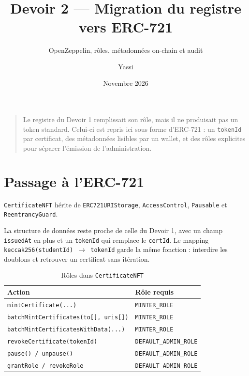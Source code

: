 \documentclass[11pt,a4paper,parskip=half]{scrartcl}
\title{Devoir 2 --- Migration du registre vers ERC-721}
\subtitle{OpenZeppelin, rôles, métadonnées on-chain et audit}
\author{Yassi}
\date{Novembre 2026}
\begin{document}
\maketitle

\begin{quote}
\small
Le registre du Devoir 1 remplissait son rôle, mais il ne produisait pas un token
standard. Celui-ci est repris ici sous forme d'ERC-721 : un \texttt{tokenId} par
certificat, des métadonnées lisibles par un wallet, et des rôles explicites pour
séparer l'émission de l'administration.
\end{quote}

\section{Passage à l'ERC-721}

{\footnotesize
\texttt{CertificateNFT} hérite de \texttt{ERC721URIStorage}, \allowbreak
\texttt{AccessControl}, \allowbreak \texttt{Pausable} et \allowbreak
\texttt{ReentrancyGuard}.}

La structure de données reste proche de celle du Devoir 1, avec un champ
\texttt{issuedAt} en plus et un \texttt{tokenId} qui remplace le \texttt{certId}.
Le mapping \texttt{keccak256(studentId) $\to$ tokenId} garde la même fonction :
interdire les doublons et retrouver un certificat sans itération.

\begin{table}[htbp]
\centering
\caption{Rôles dans \texttt{CertificateNFT}}
\small
\begin{tabularx}{\textwidth}{@{}Xl@{}}
\toprule
Action & Rôle requis \\
\midrule
\texttt{\footnotesize mintCertificate(...)} & \texttt{\footnotesize MINTER\_ROLE} \\
\texttt{\footnotesize batchMintCertificates(to[], uris[])} & \texttt{\footnotesize MINTER\_ROLE} \\
\texttt{\footnotesize batchMintCertificatesWithData(...)} & \texttt{\footnotesize MINTER\_ROLE} \\
\texttt{\footnotesize revokeCertificate(tokenId)} & \texttt{\footnotesize DEFAULT\_ADMIN\_ROLE} \\
\texttt{\footnotesize pause() / unpause()} & \texttt{\footnotesize DEFAULT\_ADMIN\_ROLE} \\
\texttt{\footnotesize grantRole / revokeRole} & \texttt{\footnotesize DEFAULT\_ADMIN\_ROLE} \\
\bottomrule
\end{tabularx}
\end{table}
\end{document}
